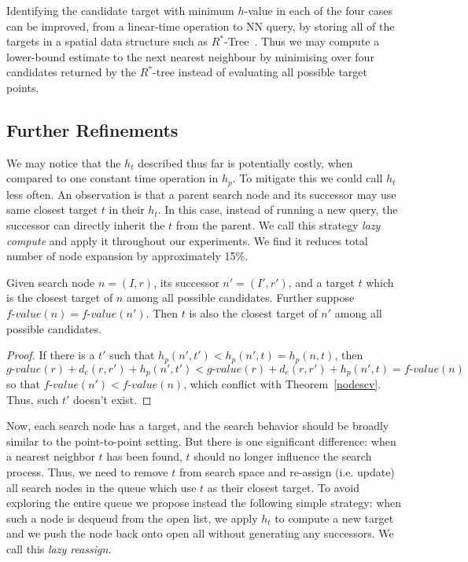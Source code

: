 \noindent
Identifying the candidate target with minimum $h$-value in each of the four cases can be improved,
from a linear-time operation to NN query, by storing all of the
targets in a spatial data structure such as $R^*$-Tree~\cite{beckmann1990r}.
Thus we may compute a lower-bound estimate to the next nearest neighbour by minimising over
four candidates returned by the $R^*$-tree instead of evaluating all possible target points.

\subsection{Further Refinements}
We may notice that the $h_t$ described thus far is potentially costly,
when compared to one constant time operation in $h_p$.
To mitigate this we could call $h_t$ less often. 
An observation is that a parent search node and its successor may use same closest target $t$
in their $h_t$. In this case, instead of running a new query, the successor can directly
inherit the $t$ from the parent.  We call this strategy \textit{lazy compute} and apply it throughout our experiments.
We find it reduces total number of node expansion by approximately 15\%.

\begin{corollary}\label{lazy-compute}
  Given search node $n=(I,r)$, its successor $n'=(I', r')$,
  and a target $t$ which is the closest target of $n$ among all possible candidates.
  Further suppose $\textit{f-value}(n)=\textit{f-value}(n')$.
  Then $t$ is also the closest target of $n'$ among all possible candidates.
\end{corollary}

\begin{proof}
  If there is a $t'$ such that $h_p(n', t') < h_p(n', t) = h_p(n, t)$,
  then 
  $$
  \textit{g-value}(r) + d_e(r, r') + h_p(n', t') < \textit{g-value}(r) + d_e(r, r') + h_p(n',
  t) = \textit{f-value}(n)
  $$
  so that $\textit{f-value}(n') < \textit{f-value}(n)$, which conflict with
  Theorem~\ref{nodescv}. Thus, such $t'$ doesn't exist.
\end{proof}

Now, each search node has a target, and the search behavior should be broadly similar to 
the point-to-point setting.  But there is one significant difference:
when a nearest neighbor $t$ has been found, $t$ should no longer influence the search process.
Thus, we need to remove $t$ from search space and re-assign (i.e. update)
all search nodes in the queue which use $t$ as their closest target. 
To avoid exploring the entire queue we propose instead the following simple strategy: 
when such a node is dequeud from the open list, we apply $h_t$ to compute a new target
and we push the node back onto open all without generating any successors. 
We call this \textit{lazy reassign}.

